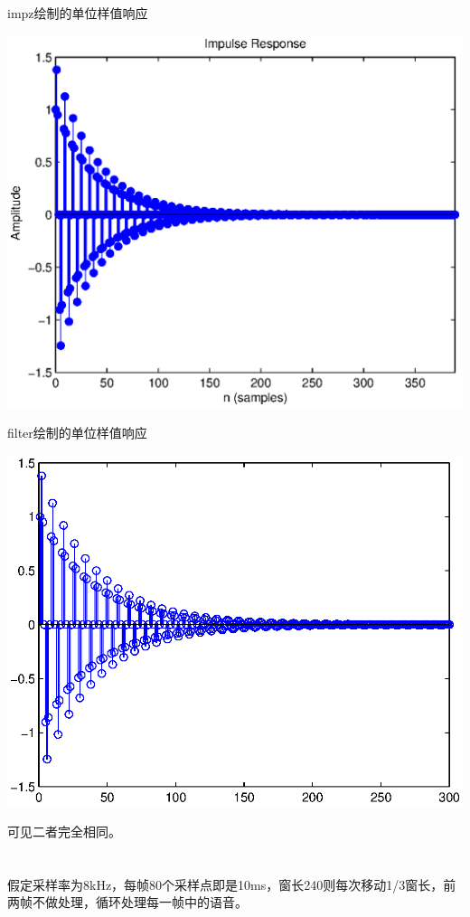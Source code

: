impz绘制的单位样值响应\begin{center}\includegraphics[width=\textwidth]{A2_1_impz.eps}\end{center}
filter绘制的单位样值响应\begin{center}\includegraphics[width=\textwidth]{A2_1_filter.eps}\end{center}
可见二者完全相同。
\section{}
\noindent{}
\par
假定采样率为8kHz，每帧80个采样点即是10ms，窗长240则每次移动1/3窗长，前两帧不做处理，循环处理每一帧中的语音。
